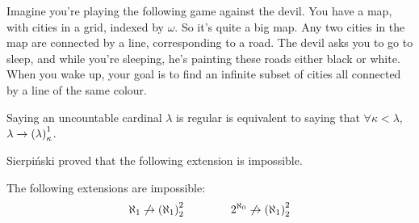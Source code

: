 Imagine you're playing the following game against the devil. You have a map, with cities in a grid, indexed by $\omega$. So it's quite a big map. Any two cities in the map are connected by a line, corresponding to a road. The devil asks you to go to sleep, and while you're sleeping, he's painting these roads either black or white. When you wake up, your goal is to find an infinite subset of cities all connected by a line of the same colour.


\begin{remark}
    Saying an uncountable cardinal $\lambda$ is regular is equivalent to saying that $\forall \kappa<\lambda$, $\lambda \to \left( \lambda \right)_{\kappa}^{1}$.
\end{remark}

Sierpiński proved that the following extension is impossible.

\begin{boxtheorem}[Sierpiński]
    The following extensions are impossible:
    \begin{align*}
        \aleph_1 \not\to \left( \aleph_1 \right)_{2}^{2}
        \qquad \qquad
        2^{\aleph_0} \not\to \left( \aleph_1 \right)_2^2
    \end{align*}
\end{boxtheorem}